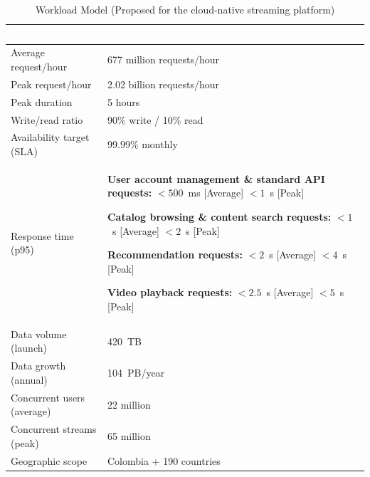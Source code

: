\documentclass{article}
\begin{document}
\begin{table}[H]
\centering
\small
\renewcommand{\arraystretch}{1.35}

\caption{Workload Model (Proposed for the cloud-native streaming platform)}
\label{tab:proposed_workload}

\begin{tabularx}{\textwidth}{|p{4.0cm}|X|}
\hline

\rowcolor[HTML]{1F2937}
\textcolor{white}{\textbf{Parameter}} &
\textcolor{white}{\textbf{Value}} \\

\hline

Average request/hour
&
677 million requests/hour
\\
\hline

Peak request/hour
&
2.02 billion requests/hour
\\
\hline

Peak duration
&
5 hours
\\
\hline

Write/read ratio
&
90\% write / 10\% read
\\
\hline

Availability target (SLA)
&
99.99\% monthly
\\
\hline

Response time (p95)
&
\textbf{User account management \& standard API requests:}
\newline
$<500$~ms [Average]
\newline
$<1$~s [Peak]

\textbf{Catalog browsing \& content search requests:}
\newline
$<1$~s [Average]
\newline
$<2$~s [Peak]

\textbf{Recommendation requests:}
\newline
$<2$~s [Average]
\newline
$<4$~s [Peak]

\textbf{Video playback requests:}
\newline
$<2.5$~s [Average]
\newline
$<5$~s [Peak]
\\
\hline

Data volume (launch)
&
420~TB
\\
\hline

Data growth (annual)
&
104~PB/year
\\
\hline

Concurrent users (average)
&
22 million
\\
\hline

Concurrent streams (peak)
&
65 million
\\
\hline

Geographic scope
&
Colombia + 190 countries
\\
\hline

\end{tabularx}

\end{table}
\end{document}
